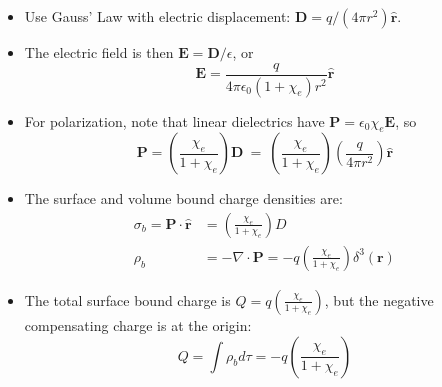 \documentclass[10pt]{article}
\begin{document}
\begin{itemize}
\item Use Gauss' Law with electric displacement: $\mathbf{D} = q/(4\pi r^2)\hat{\mathbf{r}}$.
\item The electric field is then $\mathbf{E} = \mathbf{D}/\epsilon$, or
\begin{equation}
\mathbf{E} = \frac{q}{4\pi \epsilon_0 (1+\chi_e)r^2}\hat{\mathbf{r}}
\end{equation}
\item For polarization, note that linear dielectrics have $\mathbf{P} = \epsilon_0 \chi_e \mathbf{E}$, so
\begin{equation}
\mathbf{P} = \left(\frac{\chi_e}{1+\chi_e}\right)\mathbf{D}~=~\left(\frac{\chi_e}{1+\chi_e}\right)\left(\frac{q}{4\pi r^2}\right) \hat{\mathbf{r}}
\end{equation}
\item The surface and volume bound charge densities are:
\begin{align}
\sigma_b = \mathbf{P} \cdot \hat{\mathbf{r}} &= \left(\frac{\chi_e}{1+\chi_e}\right)D \\
\rho_b &= -\nabla \cdot \mathbf{P} = -q\left(\frac{\chi_e}{1+\chi_e}\right) \delta^3(\mathbf{r})
\end{align}
\item The total surface bound charge is $Q = q \left(\frac{\chi_e}{1+\chi_e}\right)$, but the negative compensating charge is at the origin:
\begin{equation}
Q = \int \rho_b d\tau = -q \left(\frac{\chi_e}{1+\chi_e}\right)
\end{equation}
\end{itemize}
\end{document}
